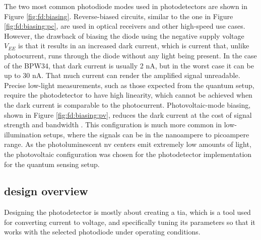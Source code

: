 The two most common photodiode modes used in photodetectors are shown in Figure \ref{fig:fd:biasing}. Reverse-biased circuits, similar to the one in Figure \ref{fig:fd:biasing:pc}, are used in optical receivers and other high-speed use cases. However, the drawback of biasing the diode using the negative supply voltage $V_{EE}$ is that it results in an increased dark current, which is current that, unlike photocurrent, runs through the diode without any light being present. In the case of the BPW34, that dark current is usually 2 \unit{\nano\ampere}, but in the worst case it can be up to 30 \unit{\nano\ampere}. That much current can render the amplified signal unreadable. Precise low-light measurements, such as those expected from the quantum setup, require the photodetector to have high linearity, which cannot be achieved when the dark current is comparable to the photocurrent. Photovoltaic-mode biasing, shown in Figure \ref{fig:fd:biasing:pv}, reduces the dark current at the cost of signal strength and bandwidth \cite{photodiodephotodiode}. This configuration is much more common in low-illumination setups, where the signals can be in the nanoampere to picoampere range. As the photoluminescent \gls{nv} centers emit extremely low amounts of light, the photovoltaic configuration was chosen for the photodetector implementation for the quantum sensing setup. 



\subsection{ design overview} \label{chap:photodetection_design}
Designing the photodetector is mostly about creating a \gls{tia}, which is a tool used for converting current to voltage, and specifically tuning its parameters so that it works with the selected photodiode under operating conditions. 


